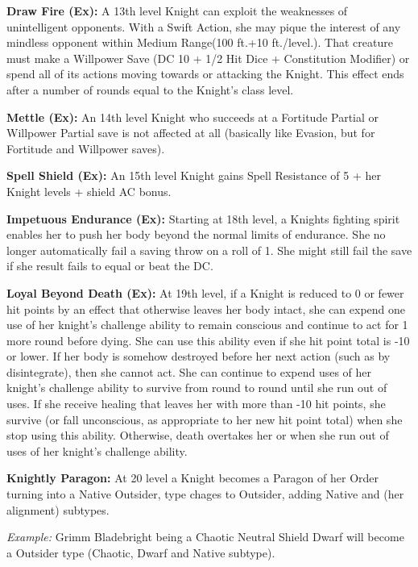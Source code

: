 

\textbf{Draw Fire (Ex):} A 13th level Knight can exploit the weaknesses of unintelligent opponents. With a Swift Action, she may pique the interest of any mindless opponent within Medium Range(100 ft.+10 ft./level.). That creature must make a Willpower Save (DC 10 + 1/2 Hit Dice + Constitution Modifier) or spend all of its actions moving towards or attacking the Knight. This effect ends after a number of rounds equal to the Knight's class level.

\textbf{Mettle (Ex):} An 14th level Knight who succeeds at a Fortitude Partial or Willpower Partial save is not affected at all (basically like Evasion, but for Fortitude and Willpower saves).

\textbf{Spell Shield (Ex):} An 15th level Knight gains Spell Resistance of 5 + her Knight levels + shield AC bonus.

\textbf{Impetuous Endurance (Ex):} Starting at 18th level, a Knights fighting spirit enables her to push her body beyond the normal limits of endurance. She no longer automatically fail a saving throw on a roll of 1. She might still fail the save if she result fails to equal or beat the DC.

\textbf{Loyal Beyond Death (Ex):} At 19th level, if a Knight is reduced to 0 or fewer hit points by an effect that otherwise leaves her body intact, she can expend one use of her knight's challenge ability to remain conscious and continue to act for 1 more round before dying. She can use this ability even if she hit point total is -10 or lower. If her body is somehow destroyed before her next action (such as by disintegrate), then she cannot act. She can continue to expend uses of her knight's challenge ability to survive from round to round until she run out of uses. If she receive healing that leaves her with more than -10 hit points, she survive (or fall unconscious, as appropriate to her new hit point total) when she stop using this ability. Otherwise, death overtakes her or when she run out of uses of her knight's challenge ability.

\textbf{Knightly Paragon:} At 20 level a Knight becomes a Paragon of her Order turning into a Native Outsider, type chages to Outsider, adding Native and (her alignment) subtypes.

\textit{Example:} Grimm Bladebright being a Chaotic Neutral Shield Dwarf will become a Outsider type (Chaotic, Dwarf and Native subtype).